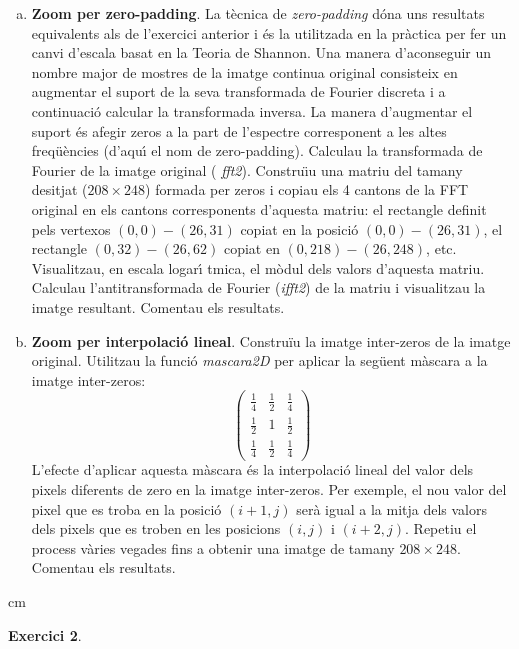 \documentclass{article}
\begin{document}
\begin{enumerate}[a)]
\item \label{1e} {\bf Zoom per zero-padding}. La t\`ecnica de {\it
zero-padding} d\'ona uns resultats equivalents als de l'exercici
anterior i \'es la utilitzada en la pr\`actica per fer un canvi
d'escala basat en la Teoria de Shannon. Una manera d'aconseguir un
nombre major de mostres de la imatge continua original consisteix
en augmentar el suport de la seva transformada de Fourier discreta
i a continuaci\'o calcular la transformada inversa. La manera
d'augmentar el suport \'es afegir zeros a la part de l'espectre
corresponent a les altes freq\"u\`encies (d'aqu\'\i $ $ el nom de
zero-padding).
\newline
Calculau la transformada de Fourier de la imatge original ({\it
fft2}). Constru\"\i u una matriu del tamany desitjat ($208 \times
248$) formada per zeros i copiau els 4 cantons de la FFT original
en els cantons corresponents d'aquesta matriu: el rectangle
definit pels vertexos $(0,0)-(26,31)$ copiat en la posici\'o
$(0,0)-(26,31)$, el rectangle $(0,32)-(26,62)$ copiat en $(0,
218)-(26,248)$, etc.
\newline
Visualitzau, en escala logar\'\i
tmica, el m\`odul dels valors d'aquesta matriu. Calculau
l'antitransformada de Fourier ({\it ifft2}) de la matriu i
visualitzau la imatge resultant. Comentau els resultats.

\item \label{1f} {\bf Zoom per interpolaci\'o lineal}. Constru\"iu
la imatge inter-zeros de la imatge original.  Utilitzau la
funci\'o {\it mascara2D} per aplicar la seg\"uent m\`ascara a la
imatge inter-zeros:
$$
\left(
\begin{array}{ccc}
\frac{1}{4} & \frac{1}{2} & \frac{1}{4}\\
\frac{1}{2} & 1 & \frac{1}{2}\\
\frac{1}{4} &  \frac{1}{2} & \frac{1}{4}
\end{array}
\right)
$$
\noindent L'efecte d'aplicar aquesta m\`ascara \'es la
interpolaci\'o lineal del valor dels pixels diferents de zero en
la imatge inter-zeros. Per exemple, el nou valor del pixel que es
troba en la posici\'o $(i+1,j)$ ser\`a igual a la mitja dels
valors dels pixels que es troben en les posicions $(i,j)$ i
$(i+2,j)$.
\newline
Repetiu el process v\`aries vegades fins a obtenir una imatge de
tamany $208 \times 248$. Comentau els resultats.
\end{enumerate}

 cm

\noindent \textbf{Exercici 2}. \label{ex2}
\newline
\end{document}
